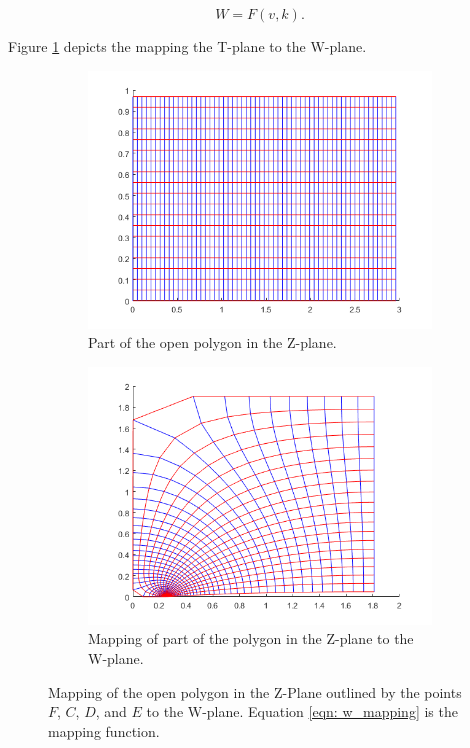 \begin{equation}
    W = F(v,k).
    \label{eqn: w_mapping}
\end{equation}

\noindent Figure \ref{fig:Z_to_w_mapping} depicts the mapping the T-plane to the W-plane. 

\begin{figure}[h]
    \centering
    \begin{subfigure}[t]{0.45\textwidth}
        \centering
        \includegraphics[width=\textwidth]{images/z2w_zplane.png}
        \caption{Part of the open polygon in the Z-plane.}
    \end{subfigure}
    \hfill
    \begin{subfigure}[t]{0.45\textwidth}
        \centering
        \includegraphics[width=\textwidth]{images/z2w_w-plane.png}
        \caption{Mapping of part of the polygon in the Z-plane to the W-plane.}
    \end{subfigure} 
    \caption[Mapping of the open polygon in the Z-Plane to the W-plane.]{Mapping of the open polygon in the Z-Plane outlined by the points $F$, $C$, $D$, and $E$ to the W-plane. Equation \ref{eqn: w_mapping} is the mapping function.} 
    \label{fig:Z_to_w_mapping}
 \end{figure}

